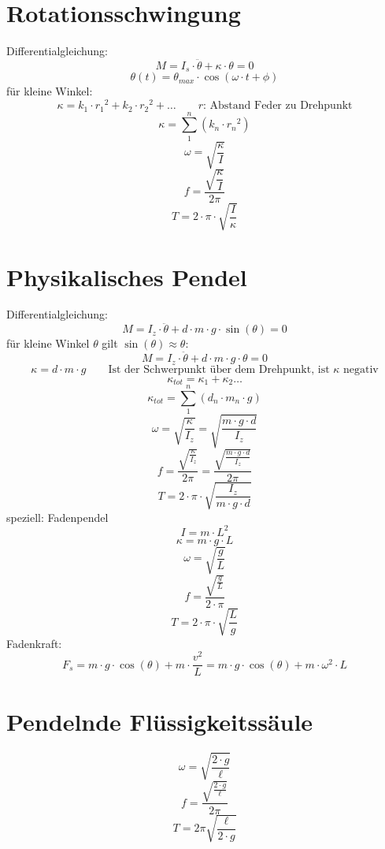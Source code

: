 \section{Rotationsschwingung}
Differentialgleichung: 
\[ \boxed{M = I_s \cdot \ddot{\theta} + \kappa \cdot \theta = 0} \]
\[ \boxed{\theta(t) = \theta_{max} \cdot \cos(\omega \cdot t + \phi)} \]
für kleine Winkel: 
\[ \boxed{\kappa = k_1 \cdot {r_1}^2 + k_2 \cdot {r_2}^2 + \dots } \qquad 
\text{$r$: Abstand Feder zu Drehpunkt} \]
\[ \boxed{\kappa = \sum_{1}^{n} \left(k_n \cdot {r_n}^2\right)} \]
\[ \boxed{\omega = \sqrt{\frac{\kappa}{I}}} \]
\[ \boxed{f = \frac{\sqrt{\dfrac{\kappa}{I}}}{2 \pi}} \]
\[ \boxed{T = 2 \cdot \pi \cdot \sqrt{\frac{I}{\kappa}}} \]

\section{Physikalisches Pendel}
Differentialgleichung: 
\[ \boxed{M = I_z \cdot \ddot{\theta} + d \cdot m \cdot g \cdot \sin(\theta) = 0} \]
für kleine Winkel $\theta$ gilt $\sin(\theta) \approx \theta$: 
\[ \boxed{M = I_z \cdot \ddot{\theta} + d \cdot m \cdot g \cdot \theta = 0} \]
\[ \boxed{\kappa = d \cdot m \cdot g} \qquad 
\text{Ist der Schwerpunkt über dem Drehpunkt, ist $\kappa$ negativ} \]
\[ \boxed{\kappa_{tot} = \kappa_1 + \kappa_2 \dots} \]
\[ \boxed{\kappa_{tot} = \sum_{1}^{n} \left(d_n \cdot m_n \cdot g\right) } \]
\[ \boxed{\omega = \sqrt{\frac{\kappa}{I_z}} 
= \sqrt{\frac{m \cdot g \cdot d}{I_z}}} \]
\[ \boxed{f = \frac{\sqrt{\frac{\kappa}{I_z}}}{2 \pi}
= \frac{\sqrt{\frac{m \cdot g \cdot d}{I_z}}}{2 \pi}} \]
\[ \boxed{T = 2 \cdot \pi \cdot \sqrt{\frac{I_z}{m \cdot g \cdot d}}} \]
speziell: Fadenpendel
\[ \boxed{I = m \cdot L^2} \]
\[ \boxed{\kappa = m \cdot g \cdot L} \]
\[ \boxed{\omega = \sqrt{\frac{g}{L}}} \]
\[ \boxed{f = \frac{\sqrt{\frac{g}{L}}}{2 \cdot \pi}} \]
\[ \boxed{T = 2 \cdot \pi \cdot \sqrt{\frac{L}{g}}} \]
Fadenkraft: 
\[ \boxed{F_s = m \cdot g \cdot \cos(\theta) + m \cdot \frac{v^2}{L} 
= m \cdot g \cdot \cos(\theta) + m \cdot \omega^2 \cdot L} \]

\section{Pendelnde Flüssigkeitssäule}
\[ \boxed{\omega = \sqrt{\frac{2 \cdot g}{\ell}}} \]
\[ \boxed{f = \frac{\sqrt{\frac{2 \cdot g}{\ell}}}{2 \pi}} \]
\[ \boxed{T = 2 \pi \sqrt{\frac{\ell}{2 \cdot g}}} \]

